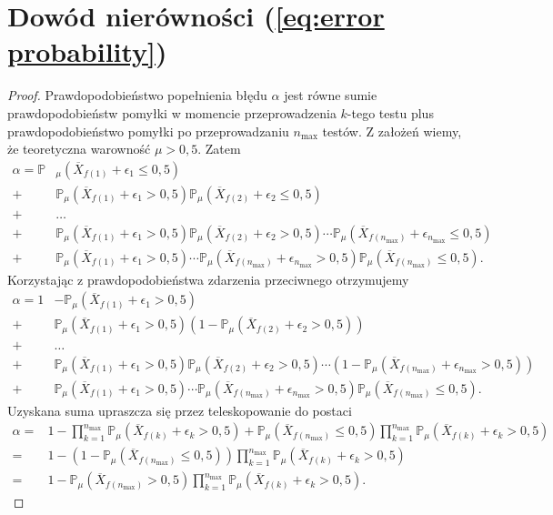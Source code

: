 \documentclass[inzynierska]{pwr_wmat_praca_dyplomowa}
\theoremstyle{plain}
\numberwithin{theorem}{chapter}
\theoremstyle{definition}
\numberwithin{theorem}{chapter}
\newcommand{\probP}{\mathbb{P}}
\newcommand{\nmax}{n_{\text{max}}}
\begin{document}
\section{Dowód nierówności (\ref{eq:error probability})}
\begin{proof}\label{proof:error probability}
	 Prawdopodobieństwo popełnienia błędu $\alpha$ jest równe sumie prawdopodobieństw pomyłki w momencie przeprowadzenia $k$-tego testu plus prawdopodobieństwo pomyłki po przeprowadzaniu $\nmax$ testów. Z założeń wiemy, że teoretyczna warowność $\mu > 0,5$. Zatem
	\begin{align*}
		\alpha=
		\probP&_{\mu}(\overline{X}_{f(1)} + \epsilon_{1} \le 0,5)  \\
		+&\probP_{\mu}(\overline{X}_{f(1)} + \epsilon_{1} > 0,5)\probP_{\mu}(\overline{X}_{f(2)} + \epsilon_{2} \le 0,5) \\
		+&\dots \\
		+&\probP_{\mu}(\overline{X}_{f(1)} + \epsilon_{1} > 0,5)\probP_{\mu}(\overline{X}_{f(2)} + \epsilon_{2} > 0,5)\cdots  \probP_{\mu}(\overline{X}_{f(\nmax)}+ \epsilon_{\nmax} \le 0,5)\\
		+&\probP_{\mu}(\overline{X}_{f(1)} + \epsilon_{1} > 0,5)\cdots  \probP_{\mu}(\overline{X}_{f(\nmax)}+ \epsilon_{\nmax} > 0,5)\probP_{\mu}(\overline{X}_{f(\nmax)} \le 0,5).
	\end{align*}
	Korzystając z prawdopodobieństwa zdarzenia przeciwnego otrzymujemy
	\begin{align*}
		\alpha=
		1& - \probP_{\mu}(\overline{X}_{f(1)} + \epsilon_{1} > 0,5) \\
		+&\probP_{\mu}(\overline{X}_{f(1)} + \epsilon_{1} > 0,5)(1 - \probP_{\mu}(\overline{X}_{f(2)} + \epsilon_{2} > 0,5)) \\
		+&\dots \\
		+&\probP_{\mu}(\overline{X}_{f(1)} + \epsilon_{1} > 0,5)\probP_{\mu}(\overline{X}_{f(2)} + \epsilon_{2} > 0,5)\cdots  (1-\probP_{\mu}(\overline{X}_{f(\nmax)}+ \epsilon_{\nmax} > 0,5))\\
		+&\probP_{\mu}(\overline{X}_{f(1)} + \epsilon_{1} > 0,5)\cdots  \probP_{\mu}(\overline{X}_{f(\nmax)}+ \epsilon_{\nmax} > 0,5)\probP_{\mu}(\overline{X}_{f(\nmax)} \le 0,5).
	\end{align*}
	Uzyskana suma upraszcza się przez teleskopowanie do postaci
	\begin{align*}
		\alpha =&  1- \prod^{\nmax}_{k=1} \probP_{\mu}(\overline{X}_{f(k)} +  \epsilon_{k} > 0,5)+ 
		\probP_{\mu}(\overline{X}_{f(\nmax)} \le 0,5)\prod^{\nmax}_{k=1} \probP_{\mu}(\overline{X}_{f(k)} +  \epsilon_{k} > 0,5)\\
		=& 1 - (1 - \probP_{\mu}(\overline{X}_{f(\nmax)} \le 0,5))
		\prod^{\nmax}_{k=1} \probP_{\mu}(\overline{X}_{f(k)} +  \epsilon_{k} > 0,5) \\
		=&1 -  \probP_{\mu}(\overline{X}_{f(\nmax)} > 0,5)
		\prod^{\nmax}_{k=1} \probP_{\mu}(\overline{X}_{f(k)} +  \epsilon_{k} > 0,5).
	\end{align*}
\end{proof}
\end{document}
